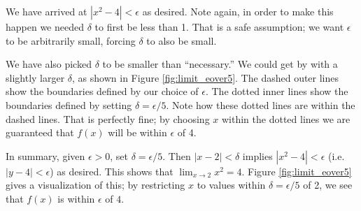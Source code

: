 {We have arrived at $|x^2 - 4|<\epsilon$ as desired.  Note again, in order to make this happen we needed $\delta$ to first be less than 1.  That is a safe assumption; we want $\epsilon$ to be arbitrarily small, forcing $\delta$ to also be small. 

We have also picked $\delta$ to be smaller than ``necessary.'' We could get by with a slightly larger $\delta$, as shown in Figure \ref{fig:limit_eover5}. The dashed outer lines show the boundaries defined by our choice of $\epsilon$. The dotted inner lines show the boundaries defined by setting $\delta = \epsilon/5$. Note how these dotted lines are within the dashed lines. That is perfectly fine; by choosing $x$ within the dotted lines we are guaranteed that $f(x)$ will be within $\epsilon$ of 4.%


In summary, given $\epsilon > 0$, set $\delta=\epsilon/5$.  Then $|x - 2| < \delta$ implies 
$|x^2 - 4|< \epsilon$ (i.e. $|y - 4|< \epsilon$) as desired.  This shows that $\displaystyle \lim_{x\rightarrow 2} x^2 = 4 $. Figure \ref{fig:limit_eover5} gives a visualization of this; by restricting $x$ to values within $\delta = \epsilon/5$ of 2, we see that $f(x)$ is within $\epsilon$ of $4$.
}\\

